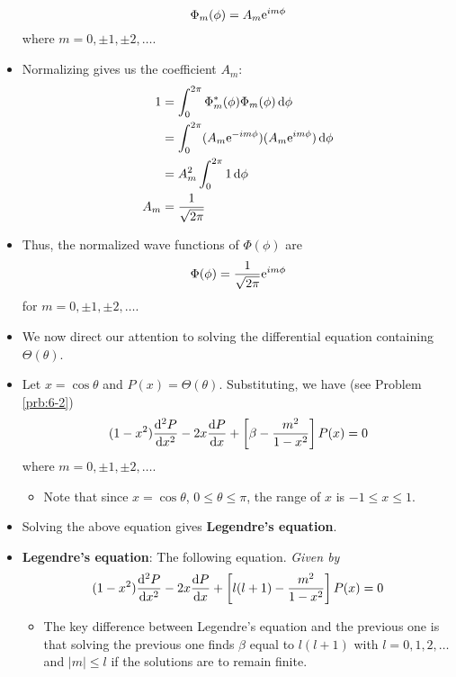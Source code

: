 \documentclass[../notes.tex]{subfiles}
\begin{document}
\begin{itemize}
    \begin{equation*}
        \Phi_m(\phi) = A_m\e[im\phi]
    \end{equation*}
    where $m=0,\pm 1,\pm 2,\dots$.
    \item Normalizing gives us the coefficient $A_m$:
    \begin{align*}
        1 &= \int_0^{2\pi}\Phi_m^*(\phi)\Phi_m(\phi)\dd{\phi}\\
        &= \int_0^{2\pi}(A_m\e[-im\phi])(A_m\e[im\phi])\dd{\phi}\\
        &= A_m^2\int_0^{2\pi}1\dd{\phi}\\
        A_m &= \frac{1}{\sqrt{2\pi}}
    \end{align*}
    \item Thus, the normalized wave functions of $\Phi(\phi)$ are
    \begin{equation*}
        \Phi(\phi) = \frac{1}{\sqrt{2\pi}}\e[im\phi]
    \end{equation*}
    for $m=0,\pm 1,\pm 2,\dots$.
    \item We now direct our attention to solving the differential equation containing $\Theta(\theta)$.
    \item Let $x=\cos\theta$ and $P(x)=\Theta(\theta)$. Substituting, we have (see Problem \ref{prb:6-2})
    \begin{equation*}
        (1-x^2)\dv[2]{P}{x}-2x\dv{P}{x}+\left[ \beta-\frac{m^2}{1-x^2} \right]P(x) = 0
    \end{equation*}
    where $m=0,\pm 1,\pm 2,\dots$.
    \begin{itemize}
        \item Note that since $x=\cos\theta$, $0\leq\theta\leq\pi$, the range of $x$ is $-1\leq x\leq 1$.
    \end{itemize}
    \item Solving the above equation gives \textbf{Legendre's equation}.
    \item \textbf{Legendre's equation}: The following equation. \emph{Given by}
    \begin{equation*}
        (1-x^2)\dv[2]{P}{x}-2x\dv{P}{x}+\left[ l(l+1)-\frac{m^2}{1-x^2} \right]P(x) = 0
    \end{equation*}
    \begin{itemize}
        \item The key difference between Legendre's equation and the previous one is that solving the previous one finds $\beta$ equal to $l(l+1)$ with $l=0,1,2,\dots$ and $|m|\leq l$ if the solutions are to remain finite.

\end{itemize}
\end{itemize}
\end{document}
